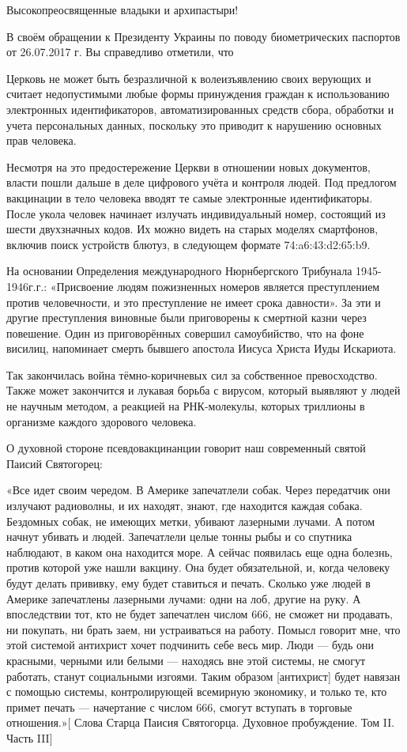\begin{itemize}
Высокопреосвященные владыки и архипастыри!

В своём обращении к Президенту Украины по поводу биометрических паспортов от
26.07.2017 г. Вы справедливо отметили, что

Церковь не может быть безразличной к волеизъявлению своих верующих и считает
недопустимыми любые формы принуждения граждан к использованию электронных
идентификаторов, автоматизированных средств сбора, обработки и учета
персональных данных, поскольку это приводит к нарушению основных прав человека.

Несмотря на это предостережение Церкви в отношении новых документов, власти
пошли дальше в деле цифрового учёта и контроля людей. Под предлогом вакцинации
в тело человека вводят те самые электронные идентификаторы. После укола человек
начинает излучать индивидуальный номер, состоящий из шести двухзначных кодов.
Их можно видеть на старых моделях смартфонов, включив поиск устройств блютуз, в
следующем формате 74:a6:43:d2:65:b9.

На основании Определения международного Нюрнбергского Трибунала 1945-1946г.г.:
«Присвоение людям пожизненных номеров является преступлением против
человечности, и это преступление не имеет срока давности». За эти и другие
преступления виновные были приговорены к смертной казни через повешение. Один
из приговорённых совершил самоубийство, что на фоне висилиц, напоминает смерть
бывшего апостола Иисуса Христа Иуды Искариота.

Так закончилась война тёмно-коричневых сил за собственное превосходство. Также
может закончится и лукавая борьба с вирусом, который выявляют у людей не
научным методом, а реакцией на РНК-молекулы, которых триллионы в организме
каждого здорового человека.

О духовной стороне псевдовакцинанции говорит наш современный святой Паисий Святогорец:

«Все идет своим чередом. В Америке запечатлели собак. Через передатчик они
излучают радиоволны, и их находят, знают, где находится каждая собака.
Бездомных собак, не имеющих метки, убивают лазерными лучами. А потом начнут
убивать и людей. Запечатлели целые тонны рыбы и со спутника наблюдают, в каком
она находится море. А сейчас появилась еще одна болезнь, против которой уже
нашли вакцину. Она будет обязательной, и, когда человеку будут делать прививку,
ему будет ставиться и печать. Сколько уже людей в Америке запечатлены лазерными
лучами: одни на лоб, другие на руку. А впоследствии тот, кто не будет
запечатлен числом 666, не сможет ни продавать, ни покупать, ни брать заем, ни
устраиваться на работу. Помысл говорит мне, что этой системой антихрист хочет
подчинить себе весь мир. Люди — будь они красными, черными или белыми —
находясь вне этой системы, не смогут работать, станут социальными изгоями.
Таким образом [антихрист] будет навязан с помощью системы, контролирующей
всемирную экономику, и только те, кто примет печать — начертание с числом 666,
смогут вступать в торговые отношения.»[ Слова Старца Паисия Святогорца.
Духовное пробуждение. Том II. Часть III]


\end{itemize}
